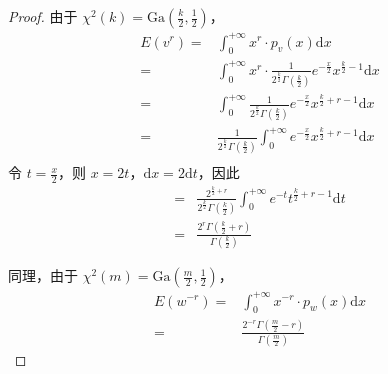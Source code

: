 \documentclass[normal,founder,mtpro2,cn]{elegantnote}
\begin{document}
\begin{enumerate}
\begin{proof}
            由于 $\chi^{2}(k)=\text{Ga}\left(\frac{k}{2},\frac{1}{2}\right)$，
            \begin{equation*}
                \begin{aligned}
                    E\left(v^{r}\right)= & \int_{0}^{+\infty}x^{r}\cdot p_{v}(x)\mathrm{d}x                                                                                 \\
                    =                    & \int_{0}^{+\infty}x^{r}\cdot \frac{1}{2^{\frac{k}{2}}\Gamma\left(\frac{k}{2}\right)}e^{-\frac{x}{2}}x^{\frac{k}{2}-1}\mathrm{d}x \\
                    =                    & \int_{0}^{+\infty}\frac{1}{2^{\frac{k}{2}}\Gamma\left(\frac{k}{2}\right)}e^{-\frac{x}{2}}x^{\frac{k}{2}+r-1}\mathrm{d}x          \\
                    =                    & \frac{1}{2^{\frac{k}{2}}\Gamma\left(\frac{k}{2}\right)}\int_{0}^{+\infty}e^{-\frac{x}{2}}x^{\frac{k}{2}+r-1}\mathrm{d}x          \\
                \end{aligned}
            \end{equation*}
            令 $t=\frac{x}{2}$，则 $x=2t$，$\mathrm{d}x=2\mathrm{d}t$，因此
            \begin{equation*}
                \begin{aligned}
                    = & \frac{2^{\frac{k}{2}+r}}{2^{\frac{k}{2}}\Gamma\left(\frac{k}{2}\right)}\int_{0}^{+\infty}e^{-t}t^{\frac{k}{2}+r-1}\mathrm{d}t \\
                    = & \frac{2^{r}\Gamma\left(\frac{k}{2}+r\right)}{\Gamma\left(\frac{k}{2}\right)}
                \end{aligned}
            \end{equation*}

            同理，由于 $\chi^{2}(m)=\text{Ga}\left(\frac{m}{2},\frac{1}{2}\right)$，
            \begin{equation*}
                \begin{aligned}
                    E\left(w^{-r}\right)= & \int_{0}^{+\infty}x^{-r}\cdot p_{w}(x)\mathrm{d}x                             \\
                    =                     & \frac{2^{-r}\Gamma\left(\frac{m}{2}-r\right)}{\Gamma\left(\frac{m}{2}\right)}
                \end{aligned}
            \end{equation*}


\end{proof}
\end{enumerate}
\end{document}
